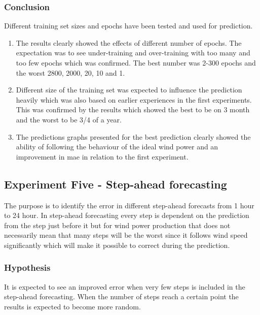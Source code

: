 \subsubsection{Conclusion}
Different training set sizes and epochs have been tested and used for prediction.

\begin{enumerate}
\item The results clearly showed the effects of different number of epochs. The expectation was to see under-training and over-training with too many and too few epochs which was confirmed. The best number was 2-300 epochs and the worst 2800, 2000, 20, 10 and 1.
\item Different size of the training set was expected to influence the prediction heavily which was also based on earlier experiences in the first experiments. This was confirmed by the results which showed the best to be on 3 month and the worst to be 3/4 of a year.
\item The predictions graphs presented for the best prediction clearly showed the ability of following the behaviour of the ideal wind power and an improvement in mae in relation to the first experiment. 
\end{enumerate}

\newpage

\subsection{Experiment Five - Step-ahead forecasting}
\label{sec:windPowerExperimentFive}
The purpose is to identify the error in different step-ahead forecasts from 1 hour to 24 hour. In step-ahead forecasting every step is dependent on the prediction from the step just before it but for wind power production that does not necessarily mean that many steps will be the worst since it follows wind speed significantly which will make it possible to correct during the prediction.

\subsubsection{Hypothesis}
It is expected to see an improved error when very few steps is included in the step-ahead forecasting. When the number of steps reach a certain point the results is expected to become more random.

